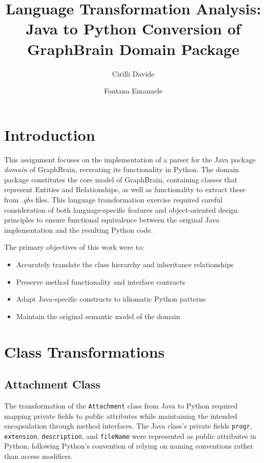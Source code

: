 \documentclass[12pt,a4paper]{article}
\title{Language Transformation Analysis: Java to Python Conversion of GraphBrain Domain Package}
\author[1]{Cirilli Davide}
\author[2]{Fontana Emanuele}
\affil[1,2]{Department of Computer Science, Università degli Studi di Bari}
\begin{document}
\maketitle


\tableofcontents
\newpage

\section{Introduction}
This assignment focuses on the implementation of a parser for the Java package \textit{domain} of GraphBrain, recreating its functionality in Python. The domain package constitutes the core model of GraphBrain, containing classes that represent Entities and Relationships, as well as functionality to extract these from \textit{.gbs} files. This language transformation exercise required careful consideration of both language-specific features and object-oriented design principles to ensure functional equivalence between the original Java implementation and the resulting Python code.

The primary objectives of this work were to:
\begin{itemize}
    \item Accurately translate the class hierarchy and inheritance relationships
    \item Preserve method functionality and interface contracts
    \item Adapt Java-specific constructs to idiomatic Python patterns
    \item Maintain the original semantic model of the domain
\end{itemize}


\section{Class Transformations}

\subsection{Attachment Class}
The transformation of the \texttt{Attachment} class from Java to Python required mapping private fields to public attributes while maintaining the intended encapsulation through method interfaces. The Java class's private fields \texttt{progr}, \texttt{extension}, \texttt{description}, and \texttt{fileName} were represented as public attributes in Python, following Python's convention of relying on naming conventions rather than access modifiers.
\end{document}
